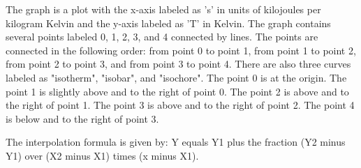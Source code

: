 The graph is a plot with the x-axis labeled as 's' in units of kilojoules per kilogram Kelvin and the y-axis labeled as 'T' in Kelvin. The graph contains several points labeled 0, 1, 2, 3, and 4 connected by lines. The points are connected in the following order: from point 0 to point 1, from point 1 to point 2, from point 2 to point 3, and from point 3 to point 4. There are also three curves labeled as "isotherm", "isobar", and "isochore". The point 0 is at the origin. The point 1 is slightly above and to the right of point 0. The point 2 is above and to the right of point 1. The point 3 is above and to the right of point 2. The point 4 is below and to the right of point 3.

The interpolation formula is given by:
Y equals Y1 plus the fraction (Y2 minus Y1) over (X2 minus X1) times (x minus X1).